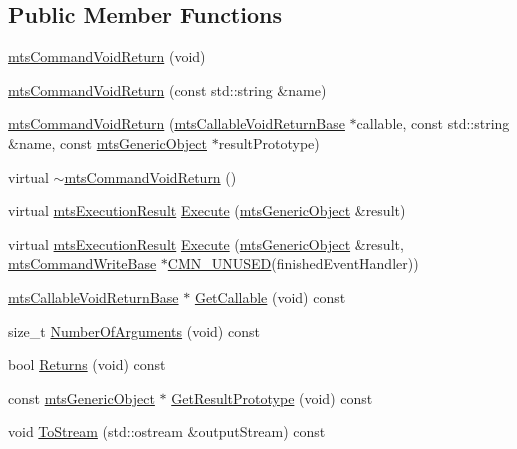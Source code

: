 \subsection*{Public Member Functions}
\begin{DoxyCompactItemize}
\item 
\hyperlink{classmts_command_void_return_a84b2df87b12e71023af81973c97ec4d5}{mts\-Command\-Void\-Return} (void)
\item 
\hyperlink{classmts_command_void_return_ac08a4ddcbf2a8ebbb6ea2656984c8f88}{mts\-Command\-Void\-Return} (const std\-::string \&name)
\item 
\hyperlink{classmts_command_void_return_ad8e8d4618f68defac066f5829e4fcd16}{mts\-Command\-Void\-Return} (\hyperlink{classmts_callable_void_return_base}{mts\-Callable\-Void\-Return\-Base} $\ast$callable, const std\-::string \&name, const \hyperlink{classmts_generic_object}{mts\-Generic\-Object} $\ast$result\-Prototype)
\item 
virtual \hyperlink{classmts_command_void_return_a2afc12e3d5e96bc31d4f523ea44e9bdf}{$\sim$mts\-Command\-Void\-Return} ()
\item 
virtual \hyperlink{classmts_execution_result}{mts\-Execution\-Result} \hyperlink{classmts_command_void_return_aae2d39f21bdefca19ee6bb4abc664ce1}{Execute} (\hyperlink{classmts_generic_object}{mts\-Generic\-Object} \&result)
\item 
virtual \hyperlink{classmts_execution_result}{mts\-Execution\-Result} \hyperlink{classmts_command_void_return_a286ec3b77f73dda7aa9a90a05ac77f7b}{Execute} (\hyperlink{classmts_generic_object}{mts\-Generic\-Object} \&result, \hyperlink{classmts_command_write_base}{mts\-Command\-Write\-Base} $\ast$\hyperlink{cmn_portability_8h_a021894e2626935fa2305434b1e893ff6}{C\-M\-N\-\_\-\-U\-N\-U\-S\-E\-D}(finished\-Event\-Handler))
\item 
\hyperlink{classmts_callable_void_return_base}{mts\-Callable\-Void\-Return\-Base} $\ast$ \hyperlink{classmts_command_void_return_ae51b5a892029231c81c830c228a2c76f}{Get\-Callable} (void) const 
\item 
size\-\_\-t \hyperlink{classmts_command_void_return_a69273f6aae517e8ddfbc72d35ad52770}{Number\-Of\-Arguments} (void) const 
\item 
bool \hyperlink{classmts_command_void_return_a6f0b136981f08438c113f79c22307723}{Returns} (void) const 
\item 
const \hyperlink{classmts_generic_object}{mts\-Generic\-Object} $\ast$ \hyperlink{classmts_command_void_return_a4374cba092b2ea18525906483c03086f}{Get\-Result\-Prototype} (void) const 
\item 
void \hyperlink{classmts_command_void_return_a38818dd8c12d96d4dd9c21dcfdbb905d}{To\-Stream} (std\-::ostream \&output\-Stream) const 
\end{DoxyCompactItemize}
